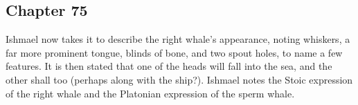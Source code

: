 \subsection{Chapter 75}

Ishmael now takes it to describe the right whale's appearance, noting whiskers,
a far more prominent tongue, blinds of bone, and two spout holes, to name a few
features. It is then stated that one of the heads will fall into the sea, and
the other shall too (perhaps along with the ship?). Ishmael notes the Stoic
expression of the right whale and the Platonian expression of the sperm whale.
